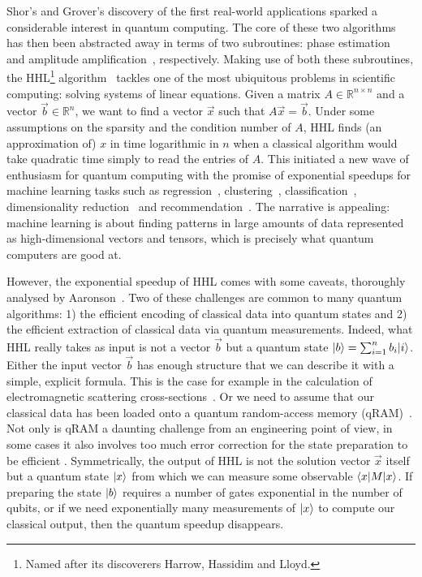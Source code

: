Shor's and Grover's discovery of the first real-world applications
sparked a considerable interest in quantum computing. The core of these
two algorithms has then been abstracted away in terms of two
subroutines: phase estimation~\cite{Kitaev95} and amplitude
amplification~\cite{BrassardEtAl02}, respectively. Making use of both
these subroutines, the
HHL\footnote{Named after its discoverers Harrow, Hassidim and Lloyd.}
algorithm~\cite{HarrowEtAl09} tackles one of
the most ubiquitous problems in scientific computing: solving systems of linear
equations. Given a matrix $A \in \mathbb{R}^{n \times n}$ and a vector
$\vec{b} \in \mathbb{R}^{n}$, we want to find a vector $\vec{x}$ such that
$A \vec{x} = \vec{b}$. Under some assumptions on the sparsity and the condition
number of $A$, HHL finds (an approximation of) $x$ in time logarithmic in $n$
when a classical algorithm would take quadratic time simply to read the entries
of $A$. This initiated a new wave of enthusiasm for quantum computing
with the promise of exponential speedups for machine learning tasks such as
regression~\cite{WiebeEtAl12}, clustering~\cite{LloydEtAl13},
classification~\cite{RebentrostEtAl14}, dimensionality
reduction~\cite{LloydEtAl14a} and recommendation~\cite{KerenidisPrakash16}.
The narrative is appealing: machine learning is about finding patterns
in large amounts of data represented as high-dimensional vectors and tensors,
which is precisely what quantum computers are good at.

However, the exponential speedup of HHL comes with some caveats,
thoroughly analysed by Aaronson~\cite{Aaronson15}.
Two of these challenges are common to many quantum algorithms:
1) the efficient encoding of classical data into quantum states and
2) the efficient extraction of classical data via quantum measurements.
Indeed, what HHL really takes as input is not a vector $\vec{b}$ but
a quantum state $|b\rangle = \sum_{i=1}^n b_i |i\rangle$.
Either the input vector $\vec{b}$ has enough structure that we can describe
it with a simple, explicit formula.
This is the case for example in the calculation of electromagnetic scattering
cross-sections~\cite{CladerEtAl13}.
Or we need to assume that our classical data has been loaded onto a
quantum random-access memory (qRAM)~\cite{GiovannettiEtAl08}.
Not only is qRAM a daunting challenge from an engineering point of view,
in some cases it also involves too much error correction
for the state preparation to be efficient \cite{ArunachalamEtAl15}.
Symmetrically, the output of HHL is not the solution vector $\vec{x}$
itself but a quantum state $|x\rangle$ from which we can measure some observable
$\langle x| M |x\rangle$. If preparing the state $|b\rangle$ requires a number of gates
exponential in the number of qubits, or if we need exponentially many
measurements of $|x\rangle$ to compute our classical output, then
the quantum speedup disappears.

